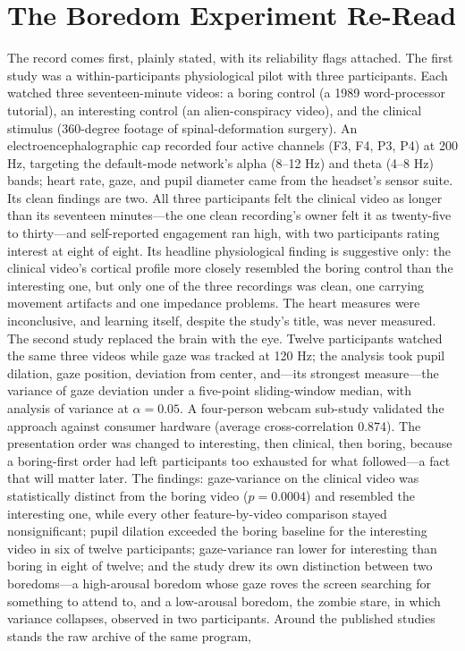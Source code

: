 
\section{The Boredom Experiment Re-Read}

The record comes first, plainly stated, with its reliability flags attached. The first study was a within-participants physiological pilot with three participants. Each watched three seventeen-minute videos: a boring control (a 1989 word-processor tutorial), an interesting control (an alien-conspiracy video), and the clinical stimulus (360-degree footage of spinal-deformation surgery). An electroencephalographic cap recorded four active channels (F3, F4, P3, P4) at 200 Hz, targeting the default-mode network's alpha (8--12 Hz) and theta (4--8 Hz) bands; heart rate, gaze, and pupil diameter came from the headset's sensor suite. Its clean findings are two. All three participants felt the clinical video as longer than its seventeen minutes---the one clean recording's owner felt it as twenty-five to thirty---and self-reported engagement ran high, with two participants rating interest at eight of eight. Its headline physiological finding is suggestive only: the clinical video's cortical profile more closely resembled the boring control than the interesting one, but only one of the three recordings was clean, one carrying movement artifacts and one impedance problems. The heart measures were inconclusive, and learning itself, despite the study's title, was never measured. The second study replaced the brain with the eye. Twelve participants watched the same three videos while gaze was tracked at 120 Hz; the analysis took pupil dilation, gaze position, deviation from center, and---its strongest measure---the variance of gaze deviation under a five-point sliding-window median, with analysis of variance at $\alpha = 0.05$. A four-person webcam sub-study validated the approach against consumer hardware (average cross-correlation 0.874). The presentation order was changed to interesting, then clinical, then boring, because a boring-first order had left participants too exhausted for what followed---a fact that will matter later. The findings: gaze-variance on the clinical video was statistically distinct from the boring video ($p = 0.0004$) and resembled the interesting one, while every other feature-by-video comparison stayed nonsignificant; pupil dilation exceeded the boring baseline for the interesting video in six of twelve participants; gaze-variance ran lower for interesting than boring in eight of twelve; and the study drew its own distinction between two boredoms---a high-arousal boredom whose gaze roves the screen searching for something to attend to, and a low-arousal boredom, the zombie stare, in which variance collapses, observed in two participants. Around the published studies stands the raw archive of the same program, 
